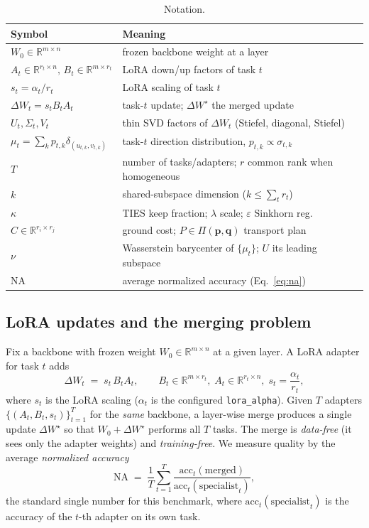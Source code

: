 \documentclass[11pt]{article}
\newcommand{\dW}{\Delta W}
\newcommand{\R}{\mathbb{R}}
\begin{document}
\begin{table}[h]
\centering
\caption{Notation.}
\label{tab:notation}
\small
\begin{tabular}{ll}
\toprule
Symbol & Meaning \\
\midrule
$W_0\in\R^{m\times n}$ & frozen backbone weight at a layer \\
$A_t\in\R^{r_t\times n},\,B_t\in\R^{m\times r_t}$ & LoRA down/up factors of task $t$ \\
$s_t=\alpha_t/r_t$ & LoRA scaling of task $t$ \\
$\dW_t=s_tB_tA_t$ & task-$t$ update; $\dW^\star$ the merged update \\
$U_t,\Sigma_t,V_t$ & thin SVD factors of $\dW_t$ (Stiefel, diagonal, Stiefel) \\
$\mu_t=\sum_k p_{t,k}\delta_{(u_{t,k},v_{t,k})}$ & task-$t$ direction distribution, $p_{t,k}\propto\sigma_{t,k}$ \\
$T$ & number of tasks/adapters; $r$ common rank when homogeneous \\
$k$ & shared-subspace dimension ($k\le \sum_t r_t$) \\
$\kappa$ & TIES keep fraction; $\lambda$ scale; $\varepsilon$ Sinkhorn reg. \\
$C\in\R^{r_i\times r_j}$ & ground cost; $P\in\Pi(\bm p,\bm q)$ transport plan \\
$\nu$ & Wasserstein barycenter of $\{\mu_t\}$; $U$ its leading subspace \\
$\mathrm{NA}$ & average normalized accuracy (Eq.~\eqref{eq:na}) \\
\bottomrule
\end{tabular}
\end{table}

\subsection{LoRA updates and the merging problem}
Fix a backbone with frozen weight $W_0\in\R^{m\times n}$ at a given layer. A LoRA adapter for task $t$
adds
\begin{equation}
\dW_t \;=\; s_t\, B_t A_t, \qquad B_t\in\R^{m\times r_t},\; A_t\in\R^{r_t\times n},\;
s_t = \frac{\alpha_t}{r_t},
\label{eq:lora}
\end{equation}
where $s_t$ is the LoRA scaling ($\alpha_t$ is the configured \texttt{lora\_alpha}). Given $T$ adapters
$\{(A_t,B_t,s_t)\}_{t=1}^T$ for the \emph{same} backbone, a layer-wise merge produces a single update
$\dW^\star$ so that $W_0+\dW^\star$ performs all $T$ tasks. The merge is \emph{data-free} (it sees only
the adapter weights) and \emph{training-free}. We measure quality by the average \emph{normalized
accuracy}
\begin{equation}
\mathrm{NA} \;=\; \frac{1}{T}\sum_{t=1}^{T}
\frac{\mathrm{acc}_t(\text{merged})}{\mathrm{acc}_t(\text{specialist}_t)},
\label{eq:na}
\end{equation}
the standard single number for this benchmark, where $\mathrm{acc}_t(\text{specialist}_t)$ is the
accuracy of the $t$-th adapter on its own task.
\end{document}
